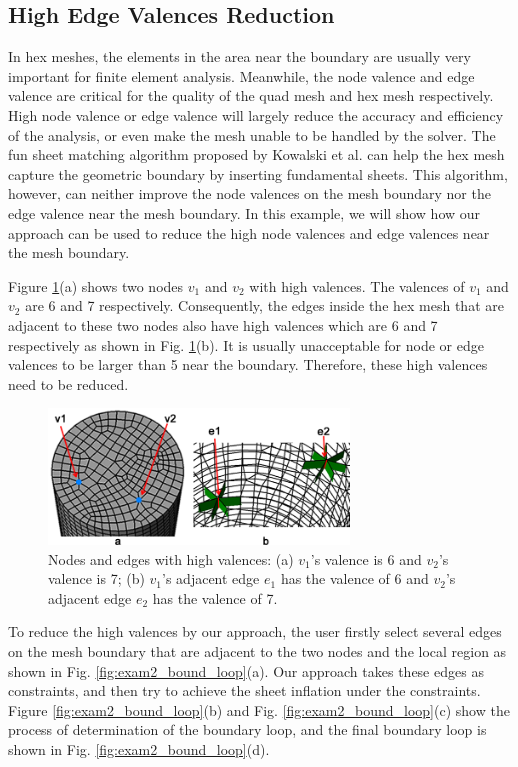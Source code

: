 \documentclass[final,5p,times,twocolumn]{elsarticle}
\begin{document}
\subsection{High Edge Valences Reduction}
\label{sec:red_edge_val}
In hex meshes, the elements in the area near the boundary are usually very important for finite element analysis\cite{Kowalski2011}. Meanwhile, the node valence and edge valence are critical for the quality of the quad mesh and hex mesh respectively\cite{Owen1998, Staten2010d,Tarini2010}. High node valence or edge valence will largely reduce the accuracy and efficiency of the analysis, or even make the mesh unable to be handled by the solver. The fun sheet matching algorithm proposed by Kowalski et al. \cite{Kowalski2011} can help the hex mesh capture the geometric boundary by inserting fundamental sheets. This algorithm, however, can neither improve the node valences on the mesh boundary nor the edge valence near the mesh boundary. In this example, we will show how our approach can be used to reduce the high node valences and edge valences near the mesh boundary.

Figure \ref{fig:exam2_input}(a) shows two nodes $v_1$ and $v_2$ with high valences. The valences of $v_1$ and $v_2$ are 6 and 7 respectively. Consequently, the edges inside the hex mesh that are adjacent to these two nodes also have high valences which are 6 and 7 respectively as shown in Fig. \ref{fig:exam2_input}(b). It is usually unacceptable for node or edge valences to be larger than 5 near the boundary. Therefore, these high valences need to be reduced.

\begin{figure}[htbp]
\begin{center}
\includegraphics[width=8cm]{figures/exam2_input.png}
\caption{Nodes and edges with high valences: (a) $v_1$'s valence is 6 and $v_2$'s valence is 7; (b) $v_1$'s adjacent edge $e_1$ has the valence of 6 and $v_2$'s adjacent edge $e_2$ has the valence of 7.}
\label{fig:exam2_input}
\end{center}
\end{figure}

To reduce the high valences by our approach, the user firstly select several edges on the mesh boundary that are adjacent to the two nodes and the local region as shown in Fig. \ref{fig:exam2_bound_loop}(a). Our approach takes these edges as constraints, and then try to achieve the sheet inflation under the constraints. Figure \ref{fig:exam2_bound_loop}(b) and Fig. \ref{fig:exam2_bound_loop}(c) show the process of determination of the boundary loop, and the final boundary loop is shown in Fig. \ref{fig:exam2_bound_loop}(d).
\end{document}
